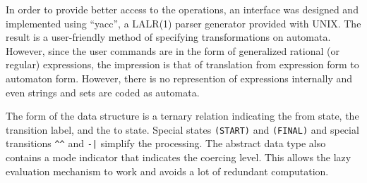 In order to provide better access to the operations, an interface was
designed and implemented using ``yacc'', a LALR(1) parser generator
provided with UNIX.
The result is a user-friendly method of specifying transformations on
automata.
However, since the user commands are in the form of generalized rational
(or regular) expressions, the impression is that of translation from
expression form to automaton form.
However, there is no represention of expressions internally and even
strings and sets are coded as automata.

The form of the data structure is a ternary relation indicating the from
state, the transition label, and the to state.
Special states \verb#(START)# and \verb#(FINAL)# and special transitions
\verb#^^# and \verb#-|# simplify the processing.
The abstract data type also contains a mode indicator that indicates the
coercing level.
This allows the lazy evaluation mechanism to work and avoids a lot of
redundant computation.




